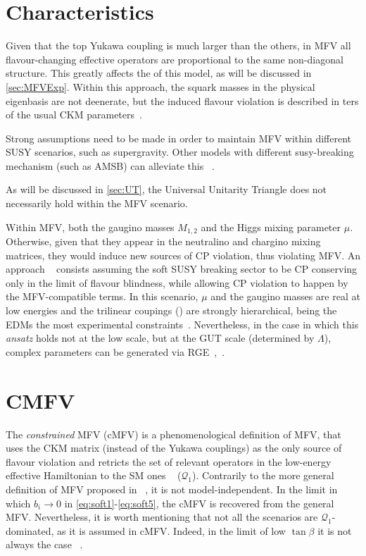 
\section{Characteristics}
\label{sec:MFVChar}
Given that the top Yukawa coupling is much larger than the others, in MFV all flavour-changing effective operators are proportional to the same non-diagonal structure. This greatly affects the  of this model, as will be discussed in \ref{sec:MFVExp}. 
Within this approach, the squark masses in the physical eigenbasis are not deenerate, but the induced flavour violation is described in ters of the usual CKM parameters~\cite{DAmbrosio:2002vsn}. 

Strong assumptions need to be made in order to maintain MFV within different SUSY scenarios, such as supergravity. Other models with different susy-breaking mechanism (such as AMSB) can alleviate this  ~\cite{DAmbrosio:2002vsn}.

As will be discussed in \ref{sec:UT}, the Universal Unitarity Triangle does not necessarily hold within the MFV scenario. 

Within MFV, both the gaugino masses $M_{1,2}$ and the Higgs mixing parameter $\mu$. Otherwise, given that they appear in the neutralino and chargino mixing matrices, they would induce new sources of CP violation, thus violating MFV. An  approach ~\cite{Straub:2009jd} consists  assuming the soft SUSY breaking sector to be CP conserving only in the limit of flavour blindness, while allowing CP violation to happen by the MFV-compatible terms. In this scenario, $\mu$ and the gaugino masses are real at low energies and the trilinear coupings () are strongly hierarchical, being the EDMs  the most  experimental constraints~\cite{Paradisi:2009ey}. Nevertheless, in the case in which this \textit{ansatz} holds not at the low scale, but at the GUT scale (determined by $\Lambda$), complex parameters can be generated via RGE~\cite{Paradisi:2009ey},~\cite{Straub:2009jd}.
\section{CMFV}
\label{sec:CMFV}
The \textit{constrained} MFV (cMFV) is a phenomenological definition of MFV, that uses the CKM matrix (instead of the Yukawa couplings) as the only source of flavour violation and retricts the set of relevant operators in the low-energy effective Hamiltonian to the SM ones ~\cite{Altmannshofer:2007cs} ($\mathcal{Q}_1$).%
Contrarily to the more general definition of MFV proposed in ~\cite{DAmbrosio:2002vsn}, it is not model-independent. In the limit in which $b_i \rightarrow 0$ in \ref{eq:soft1}-\ref{eq:soft5}, the cMFV is recovered from the general MFV. Nevertheless, it is worth mentioning that not all the scenarios are $\mathcal{Q}_1$-dominated, as it is assumed in cMFV. Indeed, in the limit of low $\tan{\beta}$ it is not always the case ~\cite{Altmannshofer:2007cs}. 


